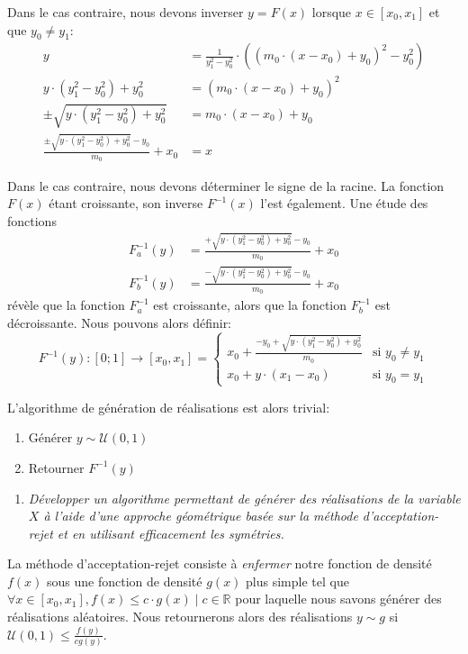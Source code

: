 \documentclass[a4paper,11pt]{report}
\newcommand{\point}[2]{
	\vspace{0.2mm}
	\begin{enumerate}[\indent #1)]
	\item {\em #2}
	\end{enumerate}
}
\begin{document}
Dans le cas contraire, nous devons inverser $y = F(x)$ lorsque $x \in [x_0, x_1]$ et que $y_0 \ne y_1$:
\begingroup
\addtolength{\jot}{1em}
\begin{align*}
	y &= \frac{1}{y^2_1 - y^2_0} \cdot \left( \left( m_0 \cdot  \left( x - x_0 \right) + y_0 \right)^2 - y^2_0 \right) \\
	y \cdot (y_1^2 - y_0^2) + y^2_0 &=  \left( m_0 \cdot  \left( x - x_0 \right) + y_0 \right)^2\\
	\pm \sqrt{y \cdot (y_1^2 - y_0^2) + y^2_0} &=  m_0 \cdot  \left( x - x_0 \right) + y_0 \\
	\frac{\pm \sqrt{y \cdot (y_1^2 - y_0^2) + y^2_0} - y_0}{m_0} + x_0 &=  x
\end{align*}
\endgroup

Dans le cas contraire, nous devons déterminer le signe de la racine. La fonction $F(x)$ étant croissante, son inverse $F^{-1}(x)$ l'est également. Une étude des fonctions
\begin{align*}
	F^{-1}_a(y) &= \frac{+\sqrt{y \cdot (y_1^2 - y_0^2) + y^2_0} - y_0}{m_0} + x_0 \\
	F^{-1}_b(y) &= \frac{-\sqrt{y \cdot (y_1^2 - y_0^2) + y^2_0} - y_0}{m_0} + x_0
\end{align*}
révèle que la fonction $F^{-1}_a$ est croissante, alors que la fonction $F^{-1}_b$ est décroissante. Nous pouvons alors définir:
\begin{equation*}
	F^{-1}(y): [0;1] \rightarrow [x_0,x_1] = \left\lbrace \begin{array}{ll}
		x_0 + \frac{- y_0 + \sqrt{y \cdot (y_1^2 - y_0^2) + y^2_0}}{m_0}
		& \text{si $y_0 \ne y_1$} \\
		x_0 + y \cdot (x_1 - x_0)
		& \text{si $y_0 = y_1$}
	\end{array} \right.
\end{equation*}

L'algorithme de génération de réalisations est alors trivial:
\begin{enumerate}[1]
	\ttfamily
	\item Générer $y \sim \mathcal{U}(0, 1)$
	\item Retourner $F^{-1}(y)$
\end{enumerate}

\point{f}{\em Développer un algorithme permettant de générer des réalisations de la variable $X$ à l'aide d'une approche géométrique basée sur la méthode d'acceptation-rejet et en utilisant efficacement les symétries.}

La méthode d'acceptation-rejet consiste à \emph{enfermer} notre fonction de densité $f(x)$ sous une fonction de densité $g(x)$ plus simple tel que $\forall x \in [x_0,x_1], f(x) \leq c \cdot g(x) \mid c \in \mathbb{R}$ pour laquelle nous savons générer des réalisations aléatoires. Nous retournerons alors des réalisations $y \sim g$ si $\mathcal{U}(0,1) \leq \frac{f(y)}{cg(y)}$.
\end{document}
